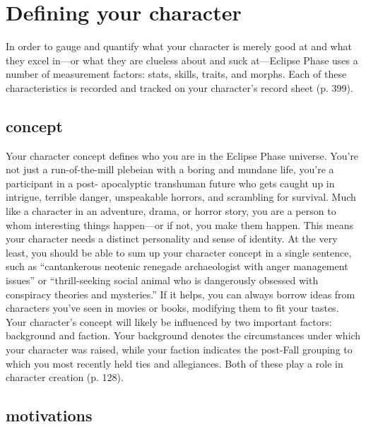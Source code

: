 \section{Defining your character} \label{sec:defin-your-char} 

In order to gauge and quantify what your character is merely good at and what they excel in—or what they are clueless about and suck at—Eclipse Phase uses a number of measurement factors: stats, skills, traits, and morphs. Each of these characteristics is recorded and tracked on your character's record sheet (p. 399). 

\subsection{concept} \label{sec:concept} 

Your character concept defines who you are in the Eclipse Phase universe. You're not just a run-of-the-mill plebeian with a boring and mundane life, you're a participant in a post- apocalyptic transhuman future who gets caught up in intrigue, terrible danger, unspeakable horrors, and scrambling for survival. Much like a character in an adventure, drama, or horror story, you are a person to whom interesting things happen—or if not, you make them happen. This means your character needs a distinct personality and sense of identity. At the very least, you should be able to sum up your character concept in a single sentence, such as “cantankerous neotenic renegade archaeologist with anger management issues” or “thrill-seeking social animal who is dangerously obsessed with conspiracy theories and mysteries.” If it helps, you can always borrow ideas from characters you've seen in movies or books, modifying them to fit your tastes. Your character's concept will likely be influenced by two important factors: background and faction. Your background denotes the circumstances under which your character was raised, while your faction indicates the post-Fall grouping to which you most recently held ties and allegiances. Both of these play a role in character creation (p. 128). 

\subsection{motivations} \label{sec:motivations} 

